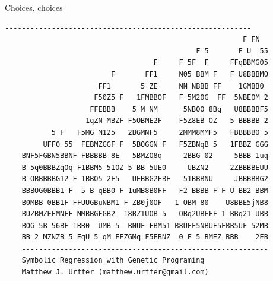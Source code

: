 \documentclass[compress]{beamer}
\begin{document}
\begin{frame}[fragile]{Choices, choices}
\centering
\tiny
\begin{Verbatim}[frame=single]
    ----------------------------------------------------------
                                                        F FN  
                                             F 5       F U  55
                                   F     F 5F  F     FFqBBMG05
                         F       FF1     N05 BBM F   F U8BBBMO
                      FF1       5 ZE     NN NBBB FF    1GMBB0 
                     F50Z5 F   1FMBBOF   F 5M20G  FF  5NBEOM 2
                    FFEBBB    5 M NM      5NBOO 8Bq   U8BBBBF5
                   1qZN MBZF F5OBME2F    F5Z8EB OZ   5 BBBBB 2
           5 F   F5MG M125   2BGMNF5     2MMM8MMF5   FBBBBBO 5
         UFF0 55  FEBMZGGF F  5BOGGN F   F5ZBNqB 5   1FBBZ GGG
    BNF5FGBN5BBNF FBBBBB 8E   5BMZO8q     2BBG 02     5BBB 1uq
    B 5q0BBBZqOq F1BBM5 51OZ 5 BB 5UE0     UBZN2     2ZBBBBEUU
    B OBBBBBG12 F 1BBO5 2F5   UEBBG2EBF   51BBBNU     JBBBBBG2
    BBBOG0BBB1 F  5 B qBB0 F 1uMB8B0FF   F2 BBBB F F U BB2 BBM
    B0MBB 0BB1F FFUUGBuNBM1 F ZB0j0OF   1 OBM 80    U8BBE5jNB8
    BUZBMZEFMNFF NMBBGFGB2  18BZ1UOB 5   OBq2UBEFF 1 BBq21 UBB
    BOG 5B 56BF 1BB0  UMB 5  BNUF FBM51 B8UFF5NBUF5FBB5UF 52MB
    BB 2 MZNZB 5 EqU 5 qM EFZGMq F5EBNZ  0 F 5 BMEZ BBB    2EB 
    ----------------------------------------------------------
    Symbolic Regression with Genetic Programing
    Matthew J. Urffer (matthew.urffer@gmail.com)
\end{Verbatim}
\end{frame}
\end{document}
